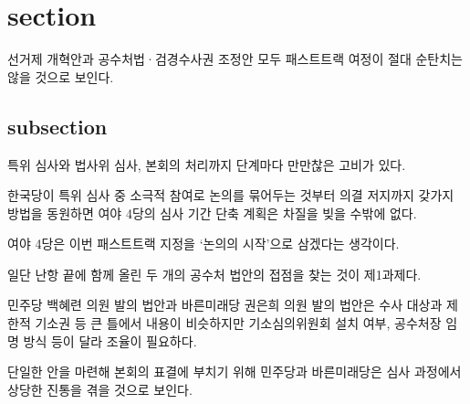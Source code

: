\documentclass[final,doctor,korean,pdfdoc]{konkukthesis}
\begin{document}
% 
% 
% 
% 
% 
% 
% 
% 
% 
\section{section}
선거제 개혁안과 공수처법·검경수사권 조정안 모두 패스트트랙 여정이 절대 순탄치는 않을 것으로 보인다.
\subsection{subsection}
특위 심사와 법사위 심사, 본회의 처리까지 단계마다 만만찮은 고비가 있다.

한국당이 특위 심사 중 소극적 참여로 논의를 묶어두는 것부터 의결 저지까지 갖가지 방법을 동원하면 여야 4당의 심사 기간 단축 계획은 차질을 빚을 수밖에 없다.

여야 4당은 이번 패스트트랙 지정을 `논의의 시작'으로 삼겠다는 생각이다.

일단 난항 끝에 함께 올린 두 개의 공수처 법안의 접점을 찾는 것이 제1과제다.

민주당 백혜련 의원 발의 법안과 바른미래당 권은희 의원 발의 법안은 수사 대상과 제한적 기소권 등 큰 틀에서 내용이 비슷하지만 기소심의위원회 설치 여부, 공수처장 임명 방식 등이 달라 조율이 필요하다.

단일한 안을 마련해 본회의 표결에 부치기 위해 민주당과 바른미래당은 심사 과정에서 상당한 진통을 겪을 것으로 보인다.
\end{document}
